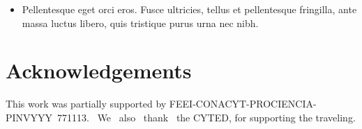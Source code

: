 \documentclass[portrait]{Hylangtechposter}
\begin{document}
\begin{multicols}{2}
\begin{itemize}
\item Pellentesque eget orci eros. Fusce ultricies, tellus et
  pellentesque fringilla, ante massa luctus libero, quis tristique
  purus urna nec nibh. 
\end{itemize}


\section*{Acknowledgements}
\small \textnormal{This work was partially supported by FEEI-CONACYT-PROCIENCIA-PINVYYY\textnumero{}~771113. ~We ~also ~thank ~the CYTED, for supporting the traveling.}





\end{multicols}
\end{document}
